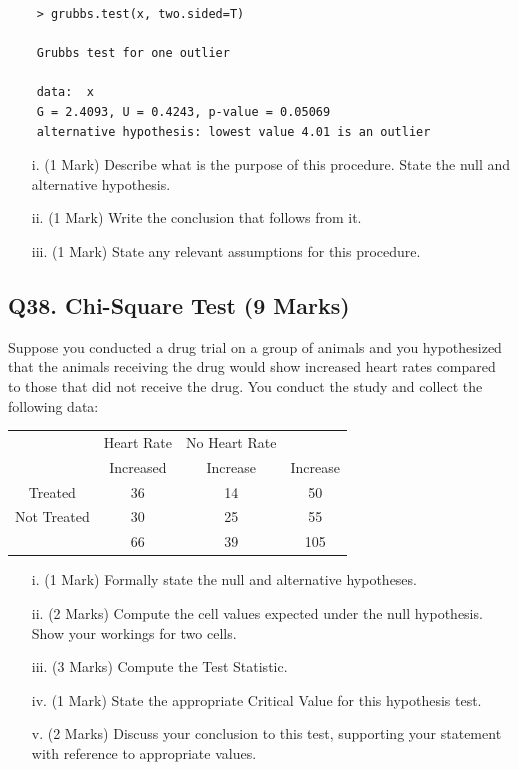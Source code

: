 \documentclass[a4paper,12pt]{article}
\begin{document}
\begin{framed}
	
	\begin{verbatim}
	> grubbs.test(x, two.sided=T)
	
	Grubbs test for one outlier
	
	data:  x
	G = 2.4093, U = 0.4243, p-value = 0.05069
	alternative hypothesis: lowest value 4.01 is an outlier
	\end{verbatim}
\end{framed}

\begin{itemize}
	\item[i.] (1 Mark) Describe what is the purpose of this procedure. State the null and alternative hypothesis.
	\item[ii.] (1 Mark) Write the conclusion that follows from it.
	\item[iii.] (1 Mark) State any relevant assumptions for this procedure.
\end{itemize}

\subsection*{Q38. Chi-Square Test (9 Marks)} %
Suppose you conducted a drug trial on a group of animals and you hypothesized that the animals receiving the drug would show increased heart rates compared to those that did not receive the drug. You conduct the study and collect the following data:
{
	\large
	\begin{center}
		\begin{tabular}{|c|c|c|c|}
			\hline  & Heart Rate & No Heart Rate  &  \\  
			& Increased & Increase & Increase \\ 
			\hline Treated  & 36 & 14 & 50 \\ 
			\hline Not Treated & 30 & 25 & 55 \\ 
			\hline  & 66 & 39 & 105 \\ 
			\hline 
		\end{tabular} 
	\end{center}
}
\begin{itemize}
	\item[i.](1 Mark) Formally state the null and alternative hypotheses.
	\item[ii.] (2 Marks) Compute the cell values expected under the null hypothesis. Show your workings for two cells.
	\item[iii.](3 Marks) Compute the Test Statistic.
	\item[iv.](1 Mark) State the appropriate Critical Value for this hypothesis test.
	\item[v.](2 Marks) Discuss your conclusion to this test, supporting your statement with reference to appropriate values.
\end{itemize}
\end{document}
